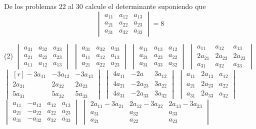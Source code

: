 De los problemas 22 al 30 calcule el determinante suponiendo que
$$
\begin{vmatrix*}
a_{11} & a_{12} & a_{13} \\
a_{21} & a_{22} & a_{23} \\
a_{31} & a_{32} & a_{33}
\end{vmatrix*}=8
$$\newpage
\begin{tasks}[
    start=22,
    style=enumerate,
    label-offset = 3mm,
    ](2)
    \task $\begin{vmatrix*}a_{31} & a_{32} & a_{33} \\ a_{21} & a_{22} & a_{23} \\ a_{11} & a_{12} & a_{13}\end{vmatrix*}$
    \task $\begin{vmatrix*}a_{31} & a_{32} & a_{33} \\ a_{11} & a_{12} & a_{13} \\ a_{21} & a_{22} & a_{23}\end{vmatrix*}$
    \task $\begin{vmatrix*}a_{11} & a_{13} & a_{12} \\ a_{21} & a_{23} & a_{22} \\ a_{31} & a_{33} & a_{32}\end{vmatrix*}$
    \task $\begin{vmatrix*}a_{11} & a_{12} & a_{13} \\ 2 a_{21} & 2 a_{22} & 2 a_{23} \\ a_{31} & a_{32} & a_{33}\end{vmatrix*}$
    \task $\begin{vmatrix*}[r]-3 a_{11} & -3 a_{12} & -3 a_{13} \\ 2 a_{21} & 2 a_{22} & 2 a_{23} \\ 5 a_{31} & 5 a_{32} & 5 a_{33}\end{vmatrix*}$
    \task $\begin{vmatrix*}4 a_{11} & -2 a & 3 a_{12} \\ 4 a_{21} & -2 a_{23} & 3 a_{22} \\ 4 a_{31} & -2 a_{33} & 3 a_{32}\end{vmatrix*}$
    \task $\begin{vmatrix*}a_{11} & 2 a_{13} & a_{12} \\ a_{21} & 2 a_{23} & a_{22} \\ a_{31} & 2 a_{33} & a_{32}\end{vmatrix*}$
    \task $\begin{vmatrix*}a_{11} & -a_{12} & a_{12} & a_{13} \\ a_{21} & -a_{22} & a_{22} & a_{23} \\ a_{31} & -a_{32} & a_{32} & a_{33}\end{vmatrix*}$
    \task $\begin{vmatrix*}2 a_{11}-3 a_{21} & 2 a_{12}-3 a_{22} & 2 a_{13}-3 a_{23} \\ a_{31} & a_{32} & a_{33} \\ a_{21} & a_{22} & a_{23}\end{vmatrix*}$
\end{tasks}
